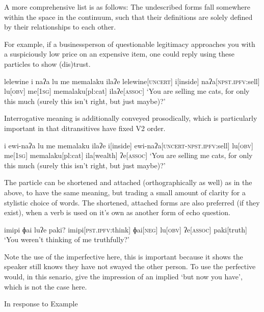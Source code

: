 A more comprehensive list is as follows:  The undescribed forms fall somewhere within the space in the continuum, such that their definitions are solely defined by their relationships to each other.

For example, if a businessperson of questionable legitimacy approaches you with a suspiciously low price on an expensive item, one could reply using these particles to show (dis)trust.

\ex
\begingl
\glpreamble lelewine i naʔa lu me memalaku ilaʔe
\endpreamble
lelewine[\textsc{uncert}]
i[inside]
naʔa[\textsc{npst.ipfv:}sell]
lu[\textsc{obv}]
me[\textsc{1sg}]
memalaku[pl:cat]
ila\footnotemark[wealth]
ʔe[\textsc{assoc}]
\glft `You are selling me cats, for only this much (surely this isn't right, but just maybe)?'
\endgl
\xe

Interrogative meaning is additionally conveyed prosodically, which is particularly important in that ditransitives have fixed V2 order.


\begingl
\glpreamble i ewi-naʔa lu me memalaku ilaʔe
\endpreamble
i[inside]
ewi-naʔa[\textsc{uncert-npst.ipfv:}sell]
lu[\textsc{obv}]
me[\textsc{1sg}]
memalaku[pl:cat]
ila[wealth]
ʔe[\textsc{assoc}]
\glft `You are selling me cats, for only this much (surely this isn't right, but just maybe)?'
\endgl
\xe

The particle  can be shortened and attached (orthographically as well) as in the above, to have the same meaning, but trading a small amount of clarity for a stylistic choice of words. The shortened, attached forms are also preferred (if they exist), when a verb is used on it's own as another form of echo question.

\ex
\begingl
\glpreamble imipi ɸai luʔe paki?
\endpreamble
imipi[\textsc{pst.ipfv}:think]
ɸai[\textsc{neg}]
lu[\textsc{obv}]
ʔe[\textsc{assoc}]
paki[truth]
\glft `You weren't thinking of me truthfully?'
\endgl
\xe

Note the use of the imperfective here, this is important because it shows the speaker still knows they have not swayed the other person. To use the perfective would, in this senario, give the impression of an implied `but now you have', which is not the case here.

In response to Example 